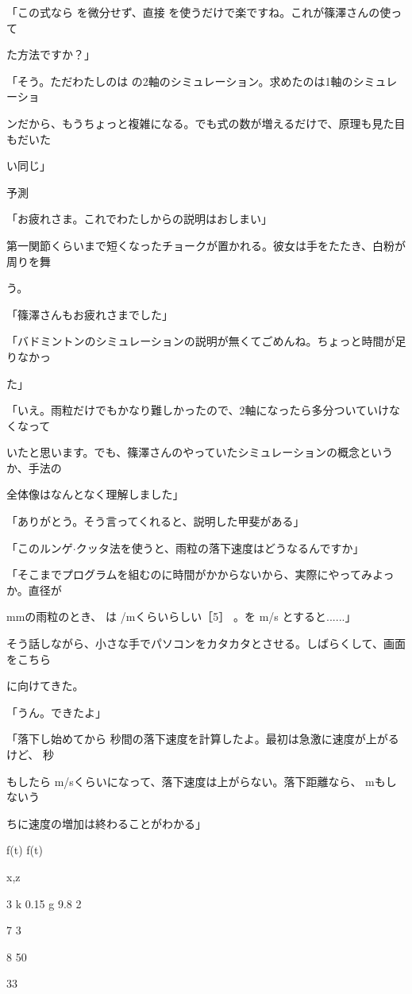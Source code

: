 「この式なら を微分せず、直接 を使うだけで楽ですね。これが篠澤さんの使って\par
た⽅法ですか？」\par
「そう。ただわたしのは の2軸のシミュレーション。求めたのは1軸のシミュレーショ\par
ンだから、もうちょっと複雑になる。でも式の数が増えるだけで、原理も⾒た⽬もだいた\par
い同じ」\par
予測\par
「お疲れさま。これでわたしからの説明はおしまい」\par
第⼀関節くらいまで短くなったチョークが置かれる。彼⼥は⼿をたたき、⽩粉が周りを舞\par
う。\par
「篠澤さんもお疲れさまでした」\par
「バドミントンのシミュレーションの説明が無くてごめんね。ちょっと時間が⾜りなかっ\par
た」\par
「いえ。⾬粒だけでもかなり難しかったので、2軸になったら多分ついていけなくなって\par
いたと思います。でも、篠澤さんのやっていたシミュレーションの概念というか、⼿法の\par
全体像はなんとなく理解しました」\par
「ありがとう。そう⾔ってくれると、説明した甲斐がある」\par
「このルンゲ$\cdot$クッタ法を使うと、⾬粒の落下速度はどうなるんですか」\par
「そこまでプログラムを組むのに時間がかからないから、実際にやってみよっか。直径が\par
mmの⾬粒のとき、 は  /mくらいらしい［5］ 。を  m/s とすると......」\par
そう話しながら、⼩さな⼿でパソコンをカタカタとさせる。しばらくして、画⾯をこちら\par
に向けてきた。\par
「うん。できたよ」\par
「落下し始めてから 秒間の落下速度を計算したよ。最初は急激に速度が上がるけど、 秒\par
もしたら  m/sくらいになって、落下速度は上がらない。落下距離なら、  mもしないう\par
ちに速度の増加は終わることがわかる」\par
f(t) f(t)\par
x,z\par
3 k 0.15 g 9.8 2\par
7 3\par
8 50\par
33\par

